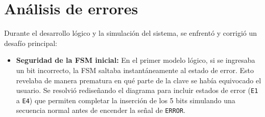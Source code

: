 \documentclass[letterpaper,12pt]{article}
\begin{document}
\section{Análisis de errores}
Durante el desarrollo lógico y la simulación del sistema, se enfrentó y corrigió un desafío principal:
\begin{itemize}
    \item \textbf{Seguridad de la FSM inicial:} En el primer modelo lógico, si se ingresaba un bit incorrecto, la FSM saltaba instantáneamente al estado de error. Esto revelaba de manera prematura en qué parte de la clave se había equivocado el usuario. Se resolvió rediseñando el diagrama para incluir estados de error (\texttt{E1} a \texttt{E4}) que permiten completar la inserción de los 5 bits simulando una secuencia normal antes de encender la señal de \texttt{ERROR}.
\end{itemize}

\end{document}
